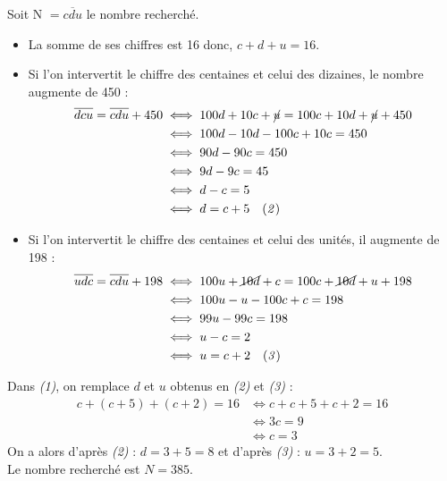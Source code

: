 \begin{corrige}
   Soit N $=\overline{cdu}$ le nombre recherché.
   \begin{itemize}
      \item La somme de ses chiffres est 16 donc, $c+d+u =16$.  \\
      \item Si l'on intervertit le chiffre des centaines et celui des dizaines, le nombre augmente de 450 :
      \begin{align*}
         \overline{dcu} =\overline{cdu}+450 & \iff 100d+10c+\cancel{u} =100c+10d+\cancel{u}+450 \\ 
         & \iff 100d-10d-100c+10c =450 \\
         & \iff 90d-90c=450 \\
         & \iff 9d-9c =45 \\
         & \iff d-c =5 \\
         & \iff d=c+5 \quad {\it (2)}
      \end{align*}
   \end{itemize}
   
\Coupe

   \begin{itemize}
      \item Si l'on intervertit le chiffre des centaines et celui des unités, il augmente de 198 :
      \begin{align*}
         \overline{udc} =\overline{cdu}+198 & \iff 100u+\cancel{10d}+c =100c+\cancel{10d}+u+198 \\
         & \iff 100u-u-100c+c =198 \\
         & \iff 99u-99c =198 \\
         & \iff u-c =2 \\
         & \iff u =c+2 \quad {\it (3)}
      \end{align*}
   \end{itemize}
   Dans {\it (1)}, on remplace $d$ et $u$ obtenus en {\it (2)} et {\it (3)} :
   \begin{align*}
   c+(c+5)+(c+2)=16 & \Longleftrightarrow c+c+5+c+2=16 \\
   & \Longleftrightarrow 3c=9 \\
   & \Longleftrightarrow c=3
   \end{align*}
   On a alors d'après {\it (2)} : $d=3+5=8$ et d'après {\it (3)} : $u=3+2=5$. \\
   Le nombre recherché est {\blue $N = 385$}. \\
\end{corrige}


